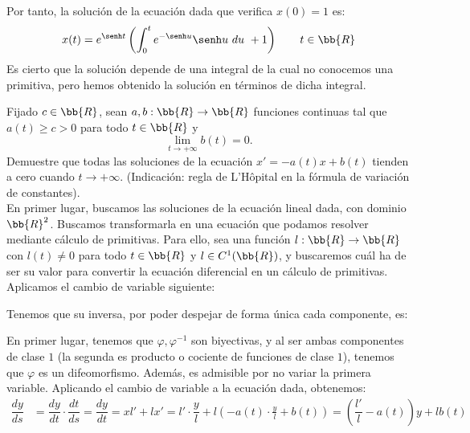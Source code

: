 \begin{ejercicio}
\begin{enumerate}
        Por tanto, la solución de la ecuación dada que verifica $x(0)=1$ es:
        \begin{equation*}
            x(t) = e^{\senh t}\left(\int_0^t e^{-\senh u}\senh u~du~+ 1\right) \qquad t\in \bb{R}
        \end{equation*}
        Es cierto que la solución depende de una integral de la cual no conocemos una primitiva, pero hemos obtenido la solución en términos de dicha integral.
    \end{enumerate}
\end{ejercicio}

\begin{ejercicio}
    Fijado $c\in \bb{R}$, sean $a, b : \bb{R} \to \bb{R}$ funciones continuas tal que $a(t) \geq c > 0$ para todo $t\in \bb{R}$ y
    \begin{equation*}
        \lim_{t \to +\infty} b(t) = 0.
    \end{equation*}
    Demuestre que todas las soluciones de la ecuación $x' = -a(t)x + b(t)$ tienden a cero cuando $t \to +\infty$. (Indicación: regla de L'Hôpital en la fórmula de variación de constantes).\\

    En primer lugar, buscamos las soluciones de la ecuación lineal dada, con dominio $\bb{R}^2$.
    Buscamos transformarla en una ecuación que podamos resolver mediante cálculo de primitivas.
    Para ello, sea una función $l:\bb{R}\to \bb{R}$ con $l(t)\neq 0$ para todo $t\in \bb{R}$ y $l\in C^1(\bb{R})$, y buscaremos cuál ha de ser su valor para convertir la ecuación diferencial en un cálculo de primitivas.
    Aplicamos el cambio de variable siguiente:

    Tenemos que su inversa, por poder despejar de forma única cada componente, es:

    En primer lugar, tenemos que $\varphi,\varphi^{-1}$ son biyectivas, y al ser ambas componentes de clase $1$ (la segunda es producto o cociente de funciones de clase $1$), tenemos que $\varphi$ es un difeomorfismo. Además, es admisible por no variar la primera variable.
    Aplicando el cambio de variable a la ecuación dada, obtenemos:
    \begin{align*}
        \dfrac{dy}{ds} &= \dfrac{dy}{dt}\cdot \dfrac{dt}{ds} = \dfrac{dy}{dt} = xl' + lx' = l'\cdot \dfrac{y}{l} + l\left(-a(t)\cdot \frac{y}{l} + b(t)\right)
        = \left(\dfrac{l'}{l} -a(t)\right)y + lb(t)
    \end{align*}


\end{ejercicio}
